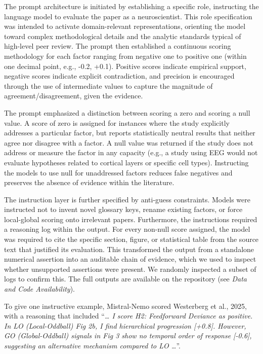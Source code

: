 \documentclass[12pt]{article}
\begin{document}
The prompt architecture is initiated by establishing a specific role, instructing the language model to evaluate the paper as a neuroscientist. This role specification was intended to activate domain-relevant representations\cite{ref58}, orienting the model toward complex methodological details and the analytic standards typical of high-level peer review. The prompt then established a continuous scoring methodology for each factor ranging from negative one to positive one (within one decimal point, e.g., -0.2, +0.1). Positive scores indicate empirical support, negative scores indicate explicit contradiction, and precision is encouraged through the use of intermediate values to capture the magnitude of agreement/disagreement, given the evidence.

The prompt emphasized a distinction between scoring a zero and scoring a null value. A score of zero is assigned for instances where the study explicitly addresses a particular factor, but reports statistically neutral results that neither agree nor disagree with a factor. A null value was returned if the study does not address or measure the factor in any capacity (e.g., a study using EEG would not evaluate hypotheses related to cortical layers or specific cell types). Instructing the models to use null for unaddressed factors reduces false negatives and preserves the absence of evidence within the literature.

The instruction layer is further specified by anti-guess constraints. Models were instructed not to invent novel glossary keys, rename existing factors, or force local-global scoring onto irrelevant papers. Furthermore, the instructions required a reasoning log within the output. For every non-null score assigned, the model was required to cite the specific section, figure, or statistical table from the source text that justified its evaluation. This transformed the output from a standalone numerical assertion into an auditable chain of evidence, which we used to inspect whether unsupported assertions were present. We randomly inspected a subset of logs to confirm this. The full outputs are available on the repository (see \emph{Data and Code Availability}).

To give one instructive example, Mistral-Nemo scored Westerberg et al., 2025, with a reasoning that included ``\emph{\ldots{} I score H2: Feedforward Deviance as positive. In LO (Local-Oddball) Fig 2b, I find hierarchical progression {[}+0.8{]}. However, GO (Global-Oddball) signals in Fig 3 show no temporal order of response {[}-0.6{]}, suggesting an alternative mechanism compared to LO \ldots{}}''.
\end{document}
